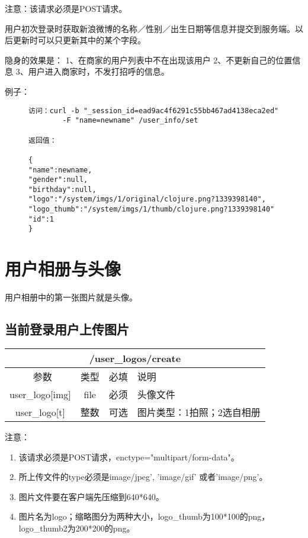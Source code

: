 \documentclass[cs4size]{ctexartutf8}
\begin{document}
注意：该请求必须是POST请求。

用户初次登录时获取新浪微博的名称／性别／出生日期等信息并提交到服务端。以后更新时可以只更新其中的某个字段。

隐身的效果是：
1、在商家的用户列表中不在出现该用户
2、不更新自己的位置信息
3、用户进入商家时，不发打招呼的信息。

例子：

\begin{figure}[H]
\begin{verbatim}
访问：curl -b "_session_id=ead9ac4f6291c55bb467ad4138eca2ed" 
        -F "name=newname" /user_info/set

返回值：

{
"name":newname,
"gender":null,
"birthday":null,
"logo":"/system/imgs/1/original/clojure.png?1339398140",
"logo_thumb":"/system/imgs/1/thumb/clojure.png?1339398140"
"id":1
}

\end{verbatim}
\end{figure}


\section{用户相册与头像}
用户相册中的第一张图片就是头像。

\subsection{当前登录用户上传图片}

\begin{table}[H]
   \begin{center}
\begin{tabular}{|c|c|c|p{12cm}|}
\hline
\multicolumn{4}{|c|}{/user\_logos/create} \\
\hline\hline
 \  参数  & 类型 & 必填 &  说明  \\
\hline
 user\_logo[img]  & file & 必须 &  头像文件\\
 \hline
 user\_logo[t]  & 整数 & 可选 &  图片类型：1拍照；2选自相册\\
\hline
\end{tabular}
   \end{center}
\end{table}

注意：

\begin{enumerate}
\item 该请求必须是POST请求，enctype="multipart/form-data"。
\item 所上传文件的type必须是image/jpeg', 'image/gif' 或者'image/png'。
\item 图片文件要在客户端先压缩到640*640。
\item 图片名为logo；缩略图分为两种大小，logo\_thumb为100*100的png，logo\_thumb2为200*200的png。
\end{enumerate}
\end{document}
